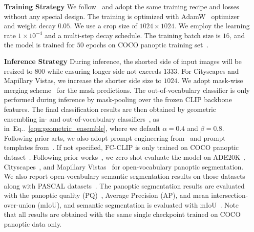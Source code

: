 \documentclass{article}
\makeatletter
\DeclareRobustCommand\onedot{\futurelet\@let@token\@onedot}
\def\@onedot{\ifx\@let@token.\else.\null\fi\xspace}
\newcommand{\equref}[1]{Eq\onedot~\eqref{#1}}
\newcommand{\modelname}{FC-CLIP\xspace}
\makeatother
\begin{document}
\noindent \textbf{Training Strategy}\quad
We follow~\cite{cheng2021masked} and adopt the same training recipe and losses without any special design. 
The training is optimized with AdamW~\cite{kingma2014adam,loshchilov2017decoupled} optimizer and weight decay $0.05$. We use a crop size of $1024\times 1024$.
We employ the learning rate $1\times10^{-4}$ and a multi-step decay schedule.
The training batch size is $16$, and the model is trained for $50$ epochs on COCO panoptic training set~\cite{lin2014microsoft}.

\noindent \textbf{Inference Strategy}\quad
During inference, the shorted side of input images will be resized to $800$ while ensuring longer side not exceeds $1333$. For Cityscapes and Mapillary Vistas, we increase the shorter side size to $1024$. We adopt mask-wise merging scheme~\cite{cheng2021masked} for the mask predictions.
The out-of-vocabulary classifier is only performed during inference by mask-pooling over the frozen CLIP backbone features.
The final classification results are then obtained by geometric ensembling in- and out-of-vocabulary classifiers~\cite{gu2021open,ghiasi2022scaling,kuo2022f,xu2023open}, as in~\equref{equ:geometric_ensemble}, where we default $\alpha=0.4$ and $\beta=0.8$.
Following prior arts, we also adopt prompt engineering from~\cite{ghiasi2022scaling,xu2023open} and prompt templates from~\cite{gu2021open,liang2022open}.
If not specified, \modelname is only trained on COCO panoptic dataset~\cite{lin2014microsoft}.
Following prior works~\cite{ghiasi2022scaling,xu2023open}, we zero-shot evaluate the model on ADE20K~\cite{zhou2017scene}, Cityscapes~\cite{Cordts2016Cityscapes}, and Mapillary Vistas~\cite{neuhold2017mapillary} for open-vocabulary panoptic segmentation.
We also report open-vocabulary semantic segmentation results on those datasets along with PASCAL datasets~\cite{everingham2010pascal,mottaghi2014role}.
The panoptic segmentation results are evaluated with the panoptic quality (PQ)~\cite{kirillov2018panoptic}, Average Precision (AP), and mean intersection-over-union (mIoU), and semantic segmentation is evaluated with mIoU~\cite{everingham2010pascal}.
Note that all results are obtained with the same single checkpoint trained on COCO panoptic data only.
\end{document}
